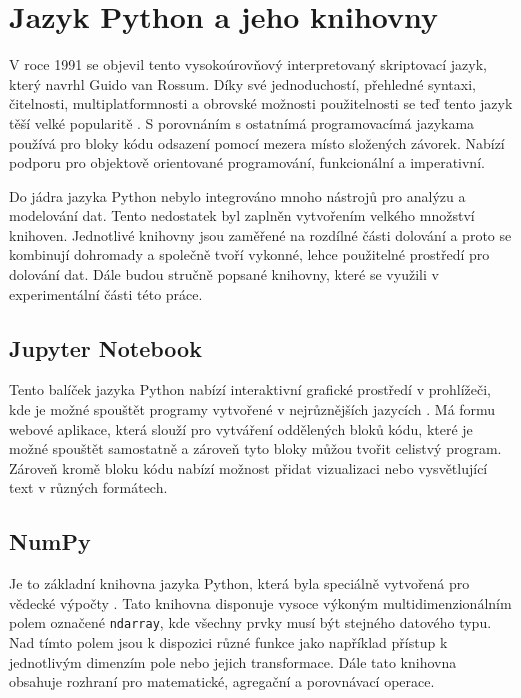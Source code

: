 \section{Jazyk Python a jeho knihovny}
\label{knihovny}
V roce 1991 se objevil tento vysokoúrovňový interpretovaný skriptovací jazyk, který navrhl Guido van Rossum. Díky své jednoduchostí, přehledné syntaxi, čitelnosti, multiplatformnosti a obrovské možnosti použitelnosti se teď tento jazyk těší velké popularitě \cite{Stancin}. S porovnáním s ostatnímá programovacímá jazykama používá pro bloky kódu odsazení pomocí mezera místo složených závorek. Nabízí podporu pro objektově orientované programování, funkcionální a imperativní.

Do jádra jazyka Python nebylo integrováno mnoho nástrojů pro analýzu a modelování dat. Tento nedostatek byl zaplněn vytvořením velkého množství knihoven. Jednotlivé knihovny jsou zaměřené na rozdílné části dolování a proto se kombinují dohromady a společně tvoří vykonné, lehce použitelné prostředí pro dolování dat. Dále budou stručně popsané knihovny, které se využili v experimentální části této práce.

\subsection*{Jupyter Notebook}
Tento balíček jazyka Python nabízí interaktivní grafické prostředí v prohlížeči, kde je možné spouštět programy vytvořené v nejrůznějších jazycích \cite{jupyter}. Má formu webové aplikace, která slouží pro vytváření oddělených bloků kódu, které je možné spouštět samostatně a zároveň tyto bloky můžou tvořit celistvý program. Zároveň kromě bloku kódu nabízí možnost přidat vizualizaci nebo vysvětlující text v různých formátech.

\subsection*{NumPy}
Je to základní knihovna jazyka Python, která byla speciálně vytvořená pro vědecké výpočty \cite{numpy}. Tato knihovna disponuje vysoce výkoným multidimenzionálním polem označené \verb|ndarray|, kde všechny prvky musí být stejného datového typu. Nad tímto polem jsou k dispozici různé funkce jako například přístup k jednotlivým dimenzím pole nebo jejich transformace. Dále tato knihovna obsahuje rozhraní pro matematické, agregační a porovnávací operace. 

